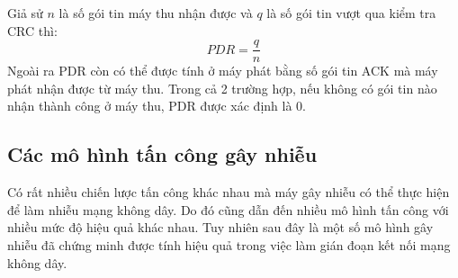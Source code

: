 \documentclass{uetgraduation}
\begin{document}
\begin{itemize}
    Giả sử $n$ là số gói tin máy thu nhận được và $q$ là số gói tin vượt qua kiểm tra CRC thì:
    \begin{equation}
        PDR = \frac{q}{n}
        \label{eq:pdr}
    \end{equation}
    Ngoài ra PDR còn có thể được tính ở máy phát bằng số gói tin ACK mà máy phát nhận được từ máy thu. Trong cả 2 trường hợp, nếu không có gói tin nào nhận thành
    công ở máy thu, PDR được xác định là 0.
\end{itemize}


\subsection{Các mô hình tấn công gây nhiễu}
Có rất nhiều chiến lược tấn công khác nhau mà máy gây nhiễu có thể thực hiện để làm nhiễu mạng không dây. Do đó cũng dẫn đến nhiều mô hình tấn công với
nhiều mức độ hiệu quả khác nhau. Tuy nhiên sau đây là một số mô hình gây nhiễu đã chứng minh được tính hiệu quả trong việc làm gián đoạn kết nối mạng không
dây.
\end{document}
